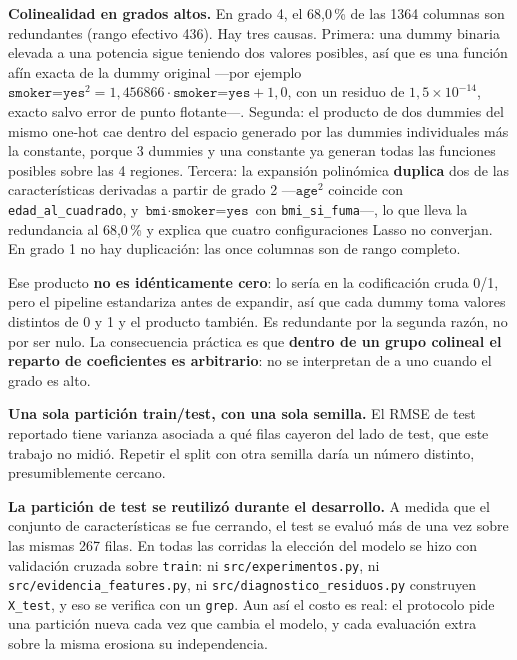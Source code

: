 \documentclass[11pt,a4paper]{article}
\begin{document}
\begin{itemize}
  \item \textbf{Colinealidad en grados altos.} En grado 4, el 68,0\,\% de las 1364 columnas son
        redundantes (rango efectivo 436). Hay tres causas. Primera: una dummy binaria elevada a
        una potencia sigue teniendo dos valores posibles, así que es una función afín exacta de
        la dummy original ---por ejemplo
        $\texttt{smoker=yes}^2 = 1{,}456866 \cdot \texttt{smoker=yes} + 1{,}0$, con un residuo
        de $1{,}5\times10^{-14}$, exacto salvo error de punto flotante---. Segunda: el producto
        de dos dummies del mismo one-hot cae dentro del espacio generado por las dummies
        individuales más la constante, porque 3 dummies y una constante ya generan todas las
        funciones posibles sobre las 4 regiones. Tercera: la expansión polinómica
        \textbf{duplica} dos de las características derivadas a partir de grado 2
        ---$\texttt{age}^2$ coincide con \texttt{edad\_al\_cuadrado}, y
        $\texttt{bmi}\cdot\texttt{smoker=yes}$ con \texttt{bmi\_si\_fuma}---, lo que lleva la
        redundancia al 68,0\,\% y explica que cuatro configuraciones Lasso no converjan. En
        grado 1 no hay duplicación: las once columnas son de rango completo.

        Ese producto \textbf{no es idénticamente cero}: lo sería en la codificación cruda 0/1,
        pero el pipeline estandariza antes de expandir, así que cada dummy toma valores
        distintos de 0 y 1 y el producto también. Es redundante por la segunda razón, no por
        ser nulo. La consecuencia práctica es que \textbf{dentro de un grupo colineal el
        reparto de coeficientes es arbitrario}: no se interpretan de a uno cuando el grado es
        alto.

  \item \textbf{Una sola partición train/test, con una sola semilla.} El RMSE de test reportado
        tiene varianza asociada a qué filas cayeron del lado de test, que este trabajo no midió.
        Repetir el split con otra semilla daría un número distinto, presumiblemente cercano.

  \begin{sloppypar}
\item \textbf{La partición de test se reutilizó durante el desarrollo.} A medida que el
        conjunto de características se fue cerrando, el test se evaluó más de una vez sobre las
        mismas 267 filas. En todas las corridas la elección del modelo se hizo con validación
        cruzada sobre \texttt{train}: ni \texttt{src/experimentos.py}, ni
        \texttt{src/evidencia\_features.py}, ni \texttt{src/diagnostico\_residuos.py}
        construyen \texttt{X\_test}, y eso se verifica con un \texttt{grep}. Aun así el costo
        es real: el protocolo pide una partición nueva cada vez que cambia el modelo, y cada
        evaluación extra sobre la misma erosiona su independencia.
\end{sloppypar}


\end{itemize}
\end{document}
